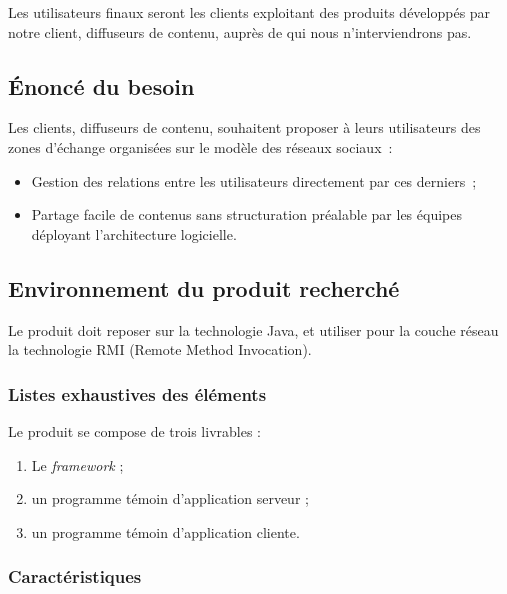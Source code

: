 Les utilisateurs finaux seront les clients exploitant des produits développés par notre client, diffuseurs de contenu, auprès de qui nous n'interviendrons pas.

\subsection{Énoncé du besoin}

Les clients, diffuseurs de contenu, souhaitent proposer à leurs utilisateurs des zones d'échange organisées sur le modèle des réseaux sociaux~:

\begin{itemize}
	\item Gestion des relations entre les utilisateurs directement par ces derniers~;
	\item Partage facile de contenus sans structuration préalable par les équipes déployant l'architecture logicielle.
\end{itemize}

\subsection{Environnement du produit recherché}

Le produit doit reposer sur la technologie Java, et utiliser pour la couche réseau la technologie RMI (Remote Method Invocation).

\subsubsection{Listes exhaustives des éléments}

Le produit se compose de trois livrables :
\begin{enumerate}
 \item Le \textit{framework} ;
 \item un programme témoin d'application serveur ;
 \item un programme témoin d'application cliente.
\end{enumerate}

\subsubsection{Caractéristiques}

